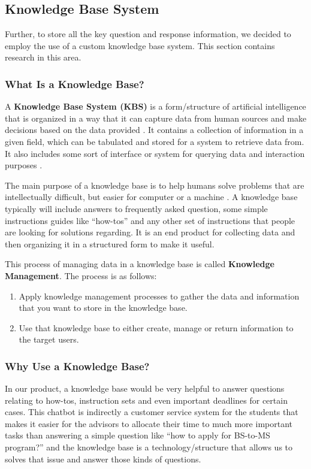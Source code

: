 \documentclass[titlepage, 12pt]{article}
\begin{document}
 
\subsection{Knowledge Base System}

Further, to store all the key question and response information, we decided to employ the use of a custom knowledge base system. This section contains research in this area.

\subsubsection{What Is a Knowledge Base?}

A \textbf{Knowledge Base System (KBS)} is a form/structure of artificial intelligence that is organized in a way that it can capture data from human sources and make decisions based on the data provided \cite{bib-2-7}. It contains a collection of information in a given field, which can be tabulated and stored for a system to retrieve data from. It also includes some sort of interface or system for querying data and interaction purposes \cite{bib-2-8}. 

The main purpose of a knowledge base is to help humans solve problems that are intellectually difficult, but easier for computer or a machine \cite{bib-2-9}. A knowledge base typically will include answers to frequently asked question, some simple instructions guides like “how-tos” and any other set of instructions that people are looking for solutions regarding. It is an end product for collecting data and then organizing it in a structured form to make it useful.

This process of managing data in a knowledge base is called \textbf{Knowledge Management}. The process is as follows:

\begin{enumerate}
    \item Apply knowledge management processes to gather the data and information that you want to store in the knowledge base.
    \item Use that knowledge base to either create, manage or return information to the target users.
\end{enumerate}
 
\subsubsection{Why Use a Knowledge Base?}

In our product, a knowledge base would be very helpful to answer questions relating to how-tos, instruction sets and even important deadlines for certain cases. This chatbot is indirectly a customer service system for the students that makes it easier for the advisors to allocate their time to much more important tasks than answering a simple question like “how to apply for BS-to-MS program?” and the knowledge base is a technology/structure that allows us to solves that issue and answer those kinds of questions.
\end{document}
